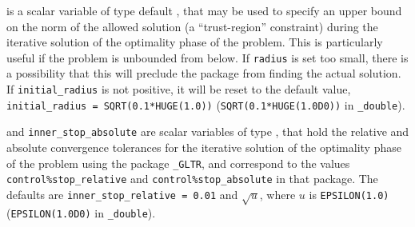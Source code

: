 \begin{description}



 is a scalar variable of type default 
\realdp, that may be used to specify an upper bound on the norm
of the allowed solution (a ``trust-region'' constraint) during the
iterative solution of the optimality phase of the problem.
This is particularly useful if the
problem is unbounded from below. If {\tt radius} is set too small, there
is a possibility that this will preclude the package from 
finding the actual solution.
If {\tt initial\_radius} is not positive, it will be reset to the 
default value, {\tt initial\_radius = SQRT(0.1*HUGE(1.0))}
({\tt SQRT(0.1*HUGE(1.0D0))} in {\tt \fullpackagename\_double}).


 and {\tt inner\_stop\_absolute} 
are scalar variables of type \realdp, 
that hold the relative and absolute convergence tolerances for the
iterative solution of the optimality phase of the problem using the package 
{\tt \libraryname\_GLTR},
and correspond to the values {\tt control\%stop\_relative} and
{\tt control\%stop\_absolute} in that package.
The defaults are 
{\tt inner\_stop\_relative = 0.01}
and  $\sqrt{u}$,
where $u$ is {\tt EPSILON(1.0)} ({\tt EPSILON(1.0D0)} in 
{\tt \fullpackagename\_double}).


\end{description}
